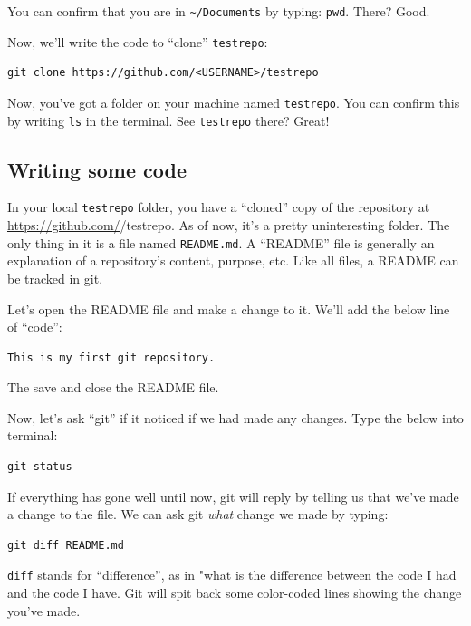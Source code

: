 \documentclass[
]{book}
\begin{document}
You can confirm that you are in \texttt{\textasciitilde{}/Documents} by typing: \texttt{pwd}. There? Good.

Now, we'll write the code to ``clone'' \texttt{testrepo}:

\begin{verbatim}
git clone https://github.com/<USERNAME>/testrepo
\end{verbatim}

Now, you've got a folder on your machine named \texttt{testrepo}. You can confirm this by writing \texttt{ls} in the terminal.
See \texttt{testrepo} there? Great!

\hypertarget{writing-some-code}{%
\subsection*{Writing some code}\label{writing-some-code}}

In your local \texttt{testrepo} folder, you have a ``cloned'' copy of the repository at \url{https://github.com/}/testrepo. As of now, it's a pretty uninteresting folder. The only thing in it is a file named \texttt{README.md}. A ``README'' file is generally an explanation of a repository's content, purpose, etc. Like all files, a README can be tracked in git.

Let's open the README file and make a change to it. We'll add the below line of ``code'':

\begin{verbatim}
This is my first git repository.
\end{verbatim}

The save and close the README file.

Now, let's ask ``git'' if it noticed if we had made any changes. Type the below into terminal:

\begin{verbatim}
git status
\end{verbatim}

If everything has gone well until now, git will reply by telling us that we've made a change to the file. We can ask git \emph{what} change we made by typing:

\begin{verbatim}
git diff README.md
\end{verbatim}

\texttt{diff} stands for ``difference'', as in "what is the difference between the code I had and the code I have. Git will spit back some color-coded lines showing the change you've made.
\end{document}
